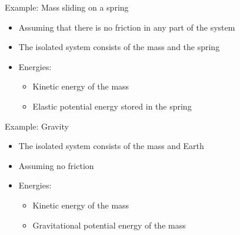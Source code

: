 \documentclass[12pt,compress,aspectratio=169]{beamer}
\begin{document}
\begin{frame}{Example: Mass sliding on a spring}
  \begin{itemize}
  \item Assuming that there is no friction in any part of the system
  \item The isolated system consists of the mass and the spring 
  \item Energies:
    \begin{itemize}
    \item Kinetic energy of the mass
    \item Elastic potential energy stored in the spring
    \end{itemize}
  \end{itemize}
  \begin{center}
  \end{center}
\end{frame}


\begin{frame}{Example: Gravity}
  \begin{center}
  \end{center}
  
  \begin{itemize}
  \item The isolated system consists of the mass and Earth
  \item Assuming no friction
  \item Energies:
    \begin{itemize}
    \item Kinetic energy of the mass
    \item Gravitational potential energy of the mass
    \end{itemize}
  \end{itemize}
\end{frame}
\end{document}
